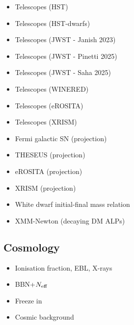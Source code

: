 \documentclass[8pt,twocolumn]{extarticle}
\begin{document}
\begin{mdframed}[everyline=true]
\begin{itemize}
    \item Telescopes (HST)~\cite{Nakayama:2022jza,Carenza:2023qxh}
    \item Telescopes (HST-dwarfs)~\cite{Todarello:2024qci}
    \item Telescopes (JWST - Janish 2023)~\cite{Janish:2023kvi}
    \item Telescopes (JWST - Pinetti 2025)~\cite{Pinetti:2025owq}
    \item Telescopes (JWST - Saha 2025)~\cite{Saha:2025any}
    \item Telescopes (WINERED)~\cite{Bessho:2022yyu,Yin:2024lla}
    \item Telescopes (eROSITA)~\cite{Fong:2024qeq}
    \item Telescopes (XRISM)~\cite{Yin:2025xad}
    \item Fermi galactic SN (projection)~\cite{Meyer:2016wrm}
     \item THESEUS (projection)~\cite{Thorpe-Morgan:2020rwc}
    \item eROSITA (projection)~\cite{Dekker:2021bos}
    \item XRISM (projection)~\cite{Dessert:2023vyl}
   \item White dwarf initial-final mass relation~\cite{Dolan:2021rya}
   \item XMM-Newton (decaying DM ALPs)~\cite{Foster:2021ngm}
\end{itemize}
\vspace{-2.5em}
\subsection*{Cosmology}\vspace{-0.5em}
\begin{itemize}\setlength\itemsep{-0.5em}
    \item Ionisation fraction, EBL, X-rays~\cite{Cadamuro:2011fd}
    \item BBN+$N_{\rm eff}$~\cite{Depta:2020wmr}
    \item Freeze in~\cite{Langhoff:2022bij}
    \item Cosmic background~\cite{Porras-Bedmar:2024uql}
\end{itemize}
\end{mdframed}
\end{document}
